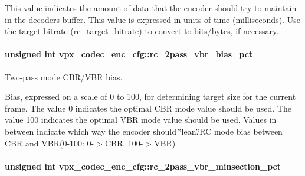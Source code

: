 This value indicates the amount of data that the encoder should try to maintain in the decoder\textquotesingle{}s buffer. This value is expressed in units of time (milliseconds). Use the target bitrate (\hyperlink{structvpx__codec__enc__cfg_ab8339685175d66710f482706cc9f0aed}{rc\+\_\+target\+\_\+bitrate}) to convert to bits/bytes, if necessary. 
\paragraph[{\texorpdfstring{rc\+\_\+2pass\+\_\+vbr\+\_\+bias\+\_\+pct}{rc_2pass_vbr_bias_pct}}]{\setlength{\rightskip}{0pt plus 5cm}unsigned int vpx\+\_\+codec\+\_\+enc\+\_\+cfg\+::rc\+\_\+2pass\+\_\+vbr\+\_\+bias\+\_\+pct}\hypertarget{structvpx__codec__enc__cfg_a21c21ff097890dc3a450731c9b504cf4}{}\label{structvpx__codec__enc__cfg_a21c21ff097890dc3a450731c9b504cf4}


Two-\/pass mode C\+B\+R/\+V\+BR bias. 

Bias, expressed on a scale of 0 to 100, for determining target size for the current frame. The value 0 indicates the optimal C\+BR mode value should be used. The value 100 indicates the optimal V\+BR mode value should be used. Values in between indicate which way the encoder should \char`\"{}lean.\char`\"{}RC mode bias between C\+BR and V\+BR(0-\/100\+: 0-\/$>$C\+BR, 100-\/$>$V\+BR) 
\paragraph[{\texorpdfstring{rc\+\_\+2pass\+\_\+vbr\+\_\+minsection\+\_\+pct}{rc_2pass_vbr_minsection_pct}}]{\setlength{\rightskip}{0pt plus 5cm}unsigned int vpx\+\_\+codec\+\_\+enc\+\_\+cfg\+::rc\+\_\+2pass\+\_\+vbr\+\_\+minsection\+\_\+pct}\hypertarget{structvpx__codec__enc__cfg_a21eb9fce0844ae07b617bf3f0a25f5a5}{}\label{structvpx__codec__enc__cfg_a21eb9fce0844ae07b617bf3f0a25f5a5}



